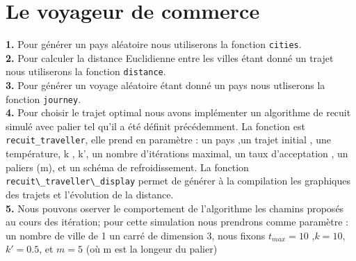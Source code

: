 \documentclass[12pt]{article}
\begin{document}
\section{Le voyageur de commerce}
\begin{center}
\end{center}
\textbf{\color{brick}1.}
Pour générer un pays aléatoire nous utiliserons la fonction \verb|cities|.\\
\textbf{\color{brick}2.}
Pour calculer la distance Euclidienne entre les villes étant donné un trajet nous utiliserons la fonction \verb|distance|.\\
\textbf{\color{brick}3.}
Pour générer un voyage aléatoire étant donné un pays nous utliserons la fonction \verb|journey|.\\
\textbf{\color{brick}4.} Pour choisir le trajet optimal nous avons implémenter un algorithme de recuit simulé avec palier tel qu'il a été définit précédemment. La fonction est \verb|recuit_traveller|, elle prend en paramètre : un pays ,un trajet initial , une température, k , k', un nombre d'itérations maximal, un taux d'acceptation , un paliers (m), et un schéma de refroidissement. La fonction \verb|recuit\_traveller\_display| permet de générer à la compilation les graphiques des trajets et l'évolution de la distance. \\

\textbf{\color{brick}5.}
Nous pouvons oserver le comportement de l'algorithme les chamins proposés au cours des itération; pour cette simulation nous prendrons comme paramètre : un nombre de ville de 1 un carré de dimension 3, nous fixons $t_{max}=10$ ,$k=10$, $k'=0.5$, et $m=5$ (où m est la longeur du palier)
\end{document}

